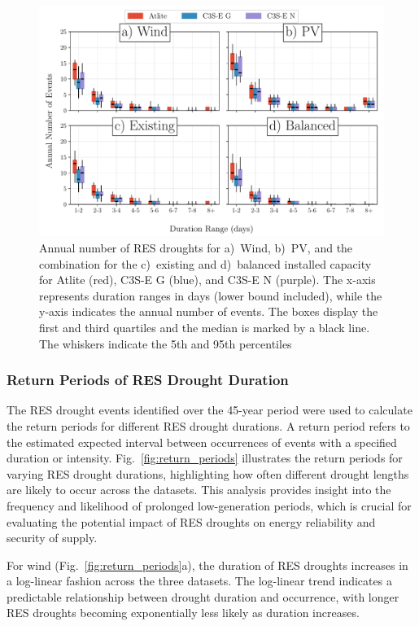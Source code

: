 \documentclass[a4paper, 11pt]{article}
\begin{document}
\begin{figure}[!ht]
	\centering
	\includegraphics[width=\textwidth]{droughts_number_events}
	\caption{Annual number of RES droughts for a)~Wind, b)~PV, and the combination for the c)~existing and d)~balanced installed capacity for Atlite (red), C3S-E G (blue), and C3S-E N (purple). The x-axis represents duration ranges in days (lower bound included), while the y-axis indicates the annual number of events. The boxes display the first and third quartiles and the median is marked by a black line. The whiskers indicate the 5th and 95th percentiles}
	\label{fig:boxplot_number_events}	
\end{figure}

\newpage
\subsubsection{Return Periods of RES Drought Duration}

The RES drought events identified over the 45-year period were used to calculate the return periods for different RES drought durations. A return period refers to the estimated expected interval between occurrences of events with a specified duration or intensity. Fig.~\ref{fig:return_periods} illustrates the return periods for varying RES drought durations, highlighting how often different drought lengths are likely to occur across the datasets. This analysis provides insight into the frequency and likelihood of prolonged low-generation periods, which is crucial for evaluating the potential impact of RES droughts on energy reliability and security of supply.

For wind (Fig.~\ref{fig:return_periods}a), the duration of RES droughts increases in a log-linear fashion across the three datasets. The log-linear trend indicates a predictable relationship between drought duration and occurrence, with longer RES droughts becoming exponentially less likely as duration increases. 
\end{document}
